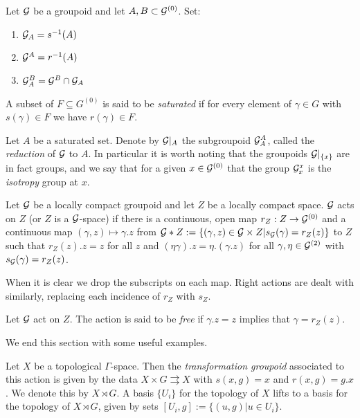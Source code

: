 \begin{definition}
Let $\mathcal{G}$ be a groupoid and let $A,B \subset \mathcal{G}^{(0)}$. Set:
\begin{enumerate}
\item $\mathcal{G}_{A}=s^{-1}(A)$
\item $\mathcal{G}^{A}=r^{-1}(A)$
\item $\mathcal{G}^{B}_{A}=\mathcal{G}^{B} \cap \mathcal{G}_{A}$
\end{enumerate}

\begin{definition}
A subset of $F\subseteq G^{(0)}$ is said to be \textit{saturated} if for every element of $\gamma \in G$ with $s(\gamma) \in F$ we have $r(\gamma) \in F$.
\end{definition}

Let $A$ be a saturated set. Denote by $\mathcal{G}|_{A}$ the subgroupoid $\mathcal{G}_{A}^{A}$, called the \textit{reduction} of $\mathcal{G}$ to $A$. In particular it is worth noting that the groupoids $\mathcal{G}|_{\lbrace x \rbrace}$ are in fact groups, and we say that for a given $x \in \mathcal{G}^{(0)}$ that the group $\mathcal{G}^{x}_{x}$ is the \textit{isotropy} group at $x$.
\end{definition}

\begin{definition}
Let $\mathcal{G}$ be a locally compact groupoid and let $Z$ be a locally compact space. $\mathcal{G}$ acts on $Z$ (or $Z$ is a $\mathcal{G}$-space) if there is a continuous, open map $r_{Z}: Z \rightarrow \mathcal{G}^{(0)}$ and a continuous map $(\gamma, z) \mapsto \gamma .z$ from $\mathcal{G} \ast Z:= \lbrace (\gamma, z) \in \mathcal{G} \times Z | s_{\mathcal{G}}(\gamma)=r_{Z}(z)\rbrace$ to $Z$ such that $r_{Z}(z).z=z$ for all $z$ and $(\eta \gamma).z= \eta.(\gamma. z)$ for all $\gamma, \eta \in \mathcal{G}^{(2)}$ with $s_{\mathcal{G}}(\gamma)=r_{Z}(z)$.
\end{definition}

When it is clear we drop the subscripts on each map. Right actions are dealt with similarly, replacing each incidence of $r_{Z}$ with $s_{Z}$.

\begin{definition}
Let $\mathcal{G}$ act on $Z$. The action is said to be \textit{free} if $\gamma.z=z$ implies that $\gamma = r_{Z}(z)$.
\end{definition}
We end this section with some useful examples.

\begin{example}\label{Ex:TransGrp}
Let $X$ be a topological $\Gamma$-space. Then the \textit{transformation groupoid} associated to this action is given by the data $X \times G \rightrightarrows X$ with $s(x,g)=x$ and $r(x,g)=g.x$. We denote this by $X \rtimes G$. A basis $\lbrace U_{i} \rbrace$ for the topology of $X$ lifts to a basis for the topology of $X \rtimes G$, given by sets $[U_{i},g]:=\lbrace (u,g) | u \in U_{i} \rbrace$. 
\end{example}

